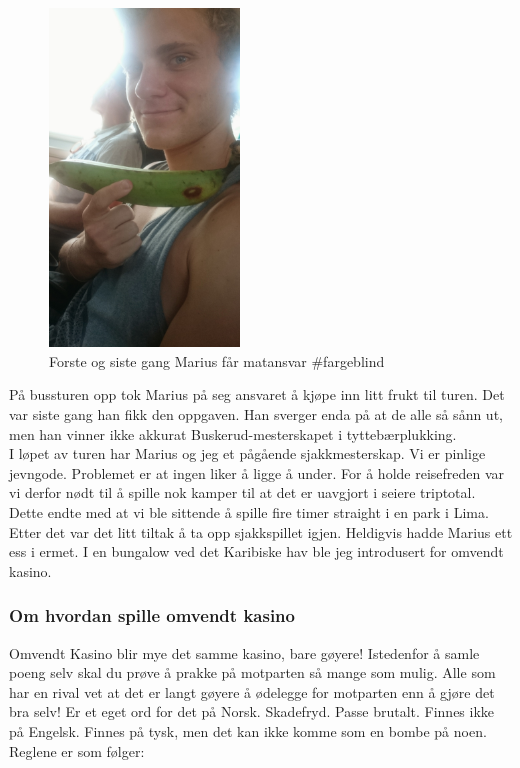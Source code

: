 \begin{figure}
	\begin{center}
		\includegraphics[width=0.45\textwidth]{Kjopmatmarius}
	\end{center}
	\caption*{Forste og siste gang Marius får matansvar
	\#fargeblind}
\end{figure}
På bussturen opp tok Marius på seg ansvaret å kjøpe
inn litt frukt til turen. Det var siste gang han fikk den oppgaven.
Han sverger enda på at de alle så sånn ut, men han vinner ikke
akkurat  Buskerud-mesterskapet i tyttebærplukking.\\

I løpet av turen har Marius og jeg et pågående sjakkmesterskap. Vi er
pinlige jevngode. Problemet er at ingen liker å ligge å under.
For å holde reisefreden var vi derfor nødt til å spille nok kamper til
at det er uavgjort i seiere triptotal. Dette endte med at vi ble
sittende å spille fire timer straight i en park i Lima. Etter det var
det litt tiltak å ta opp sjakkspillet igjen. Heldigvis hadde Marius
ett ess i ermet. I en bungalow ved det Karibiske hav ble jeg
introdusert for omvendt kasino.
\clearpage

\subsubsection{Om hvordan spille omvendt kasino}
Omvendt Kasino blir mye det samme kasino, bare gøyere! Istedenfor
å samle poeng selv skal du prøve å prakke på motparten så mange som
mulig. Alle som har en rival vet at det er langt gøyere å ødelegge for
motparten enn å gjøre det bra selv! Er et eget ord for det på Norsk.
Skadefryd. Passe brutalt. Finnes ikke på Engelsk. Finnes på tysk, men
det kan ikke komme som en bombe på noen. Reglene er som følger:

